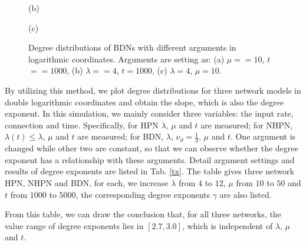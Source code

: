 \documentclass[final]{IEEEtran}
\begin{document}
\begin{figure}[t!]
\begin{minipage}[b]{0.3\linewidth}
    \centering
 \parbox{15.5cm}{\small \hspace{2.5cm}(b)}
\end{minipage}
\begin{minipage}[b]{0.3\linewidth}
    \centering
 \parbox{15.5cm}{\small \hspace{2.5cm}(c)}
\end{minipage}
\hspace{3ex}
 \caption{\label{f11} Degree distributions of BDNs with different arguments in logarithmic coordinates. Arguments are setting as: (a) $\mu$$==$$10$, $t$$==$$1000$, (b) $\lambda$$==$$4$, $t$$=$$1000$, (c) $\lambda$$=$$4$, $\mu$$=$$10$.}
\end{figure}

By utilizing this method, we plot degree distributions for three
network models in double logarithmic coordinates and obtain the
slope, which is also the degree exponent. In this simulation, we
mainly consider three variables: the input rate, connection and
time. Specifically, for HPN $\lambda$, $\mu$ and $t$ are measured;
for NHPN, $\lambda(t)$$\leq$$\lambda$, $\mu$ and $t$ are measured;
for BDN, $\lambda$, $\nu_{d}$$=$$\frac{1}{3}$, $\mu$ and $t$. One
argument is changed while other two are constant, so that we can
observe whether the degree exponent has a relationship with these
arguments. Detail argument settings and results of degree
exponents are listed in Tab. \ref{tx}. The table gives three
network HPN, NHPN and BDN, for each, we increase $\lambda$ from
$4$ to $12$, $\mu$ from $10$ to $50$ and $t$ from $1000$ to
$5000$, the corresponding degree exponents $\gamma$ are also
listed.


From this table, we can draw the conclusion that, for all three
networks, the value range of degree exponents lies in $[2.7,
3.0]$, which is independent of $\lambda$, $\mu$ and $t$. %
\end{document}
